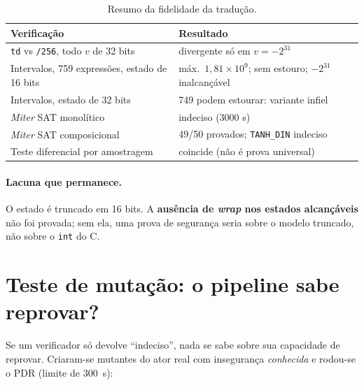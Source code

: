 \documentclass[12pt,openright,oneside,a4paper,chapter=TITLE,sumario=tradicional,english,brazil]{abntex2}
\begin{document}
\begin{table}[htb]
\caption{Resumo da fidelidade da tradução.}\label{tab:fid}
\centering
\begin{tabular}{p{7.2cm}|p{5.6cm}}
\toprule
\textbf{Verificação} & \textbf{Resultado} \\
\midrule
\texttt{td} vs \texttt{/256}, todo $v$ de 32 bits & divergente só em $v=-2^{31}$ \\
Intervalos, 759 expressões, estado de 16 bits & máx.\ $1{,}81\times10^9$; sem estouro; $-2^{31}$ inalcançável \\
Intervalos, estado de 32 bits & 749 podem estourar: variante infiel \\
\emph{Miter} SAT monolítico & indeciso (3000 s) \\
\emph{Miter} SAT composicional & 49/50 provados; \texttt{TANH\_DIN} indeciso \\
Teste diferencial por amostragem & coincide (não é prova universal) \\
\bottomrule
\end{tabular}
\end{table}

\paragraph{Lacuna que permanece.} O estado é truncado em 16 bits. A \textbf{ausência de \emph{wrap} nos estados alcançáveis} não foi provada; sem ela, uma prova de segurança seria sobre o modelo truncado, não sobre o \texttt{int} do C.

\section{Teste de mutação: o pipeline sabe reprovar?}

Se um verificador só devolve ``indeciso'', nada se sabe sobre sua capacidade de reprovar. Criaram-se mutantes do ator real com insegurança \emph{conhecida} e rodou-se o PDR (limite de 300~s):
\end{document}
